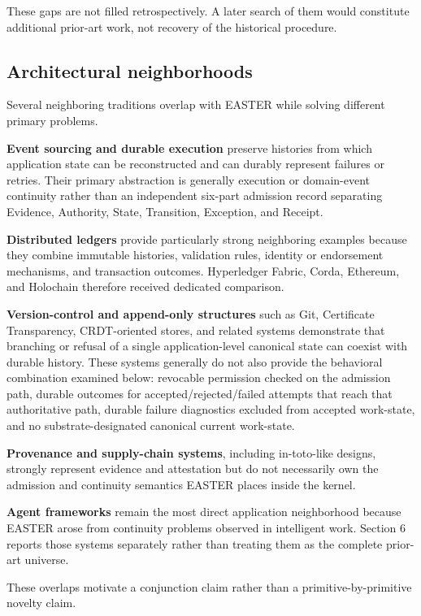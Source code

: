 \documentclass[11pt]{article}
\begin{document}
These gaps are not filled retrospectively. A later search of them would constitute additional prior-art work, not recovery of the historical procedure.

\subsection{Architectural neighborhoods}

Several neighboring traditions overlap with EASTER while solving different primary problems.

\textbf{Event sourcing and durable execution} preserve histories from which application state can be reconstructed and can durably represent failures or retries. Their primary abstraction is generally execution or domain-event continuity rather than an independent six-part admission record separating Evidence, Authority, State, Transition, Exception, and Receipt.

\textbf{Distributed ledgers} provide particularly strong neighboring examples because they combine immutable histories, validation rules, identity or endorsement mechanisms, and transaction outcomes. Hyperledger Fabric, Corda, Ethereum, and Holochain therefore received dedicated comparison.

\textbf{Version-control and append-only structures} such as Git, Certificate Transparency, CRDT-oriented stores, and related systems demonstrate that branching or refusal of a single application-level canonical state can coexist with durable history. These systems generally do not also provide the behavioral combination examined below: revocable permission checked on the admission path, durable outcomes for accepted/rejected/failed attempts that reach that authoritative path, durable failure diagnostics excluded from accepted work-state, and no substrate-designated canonical current work-state.

\textbf{Provenance and supply-chain systems}, including in-toto-like designs, strongly represent evidence and attestation but do not necessarily own the admission and continuity semantics EASTER places inside the kernel.

\textbf{Agent frameworks} remain the most direct application neighborhood because EASTER arose from continuity problems observed in intelligent work. Section 6 reports those systems separately rather than treating them as the complete prior-art universe.

These overlaps motivate a conjunction claim rather than a primitive-by-primitive novelty claim.
\end{document}
